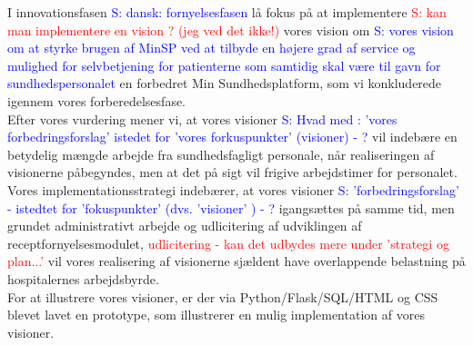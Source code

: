 I innovationsfasen 
\textcolor{blue}{S: dansk: fornyelsesfasen} lå fokus på at implementere 
\textcolor{red}{S: kan man implementere en vision ? (jeg ved det ikke!) } 
vores vision om 
\textcolor{blue}{S: vores vision om at styrke brugen af MinSP ved at tilbyde en højere grad af service og mulighed for selvbetjening for patienterne som samtidig skal være til gavn for sundhedspersonalet}
en forbedret Min Sundhedsplatform, som vi konkluderede igennem vores forberedelsesfase.\\
Efter vores vurdering mener vi, at vores visioner 
\textcolor{blue}{S: Hvad med  : 'vores forbedringsforslag' istedet for 'vores forkuspunkter' (visioner) - ?}
 vil indebære en betydelig mængde arbejde fra sundhedsfagligt personale, når realiseringen af visionerne påbegyndes, men at det på sigt vil frigive arbejdstimer for personalet.\\
Vores implementationsstrategi indebærer, at vores visioner 
\textcolor{blue}{S: 'forbedringsforslag' - istedtet for 'fokuspunkter' (dvs. 'visioner' ) - ?}
 igangsættes på samme tid, men grundet administrativt arbejde og udlicitering af udviklingen af receptfornyelsesmodulet,
 \textcolor{red}{udlicitering - kan det udbydes mere under 'strategi og plan...'}
 vil vores realisering af visionerne sjældent have overlappende belastning på hospitalernes arbejdsbyrde.\\
For at illustrere vores visioner, er der via Python/Flask/SQL/HTML og CSS blevet lavet en prototype, som illustrerer en mulig implementation af vores visioner.\\
